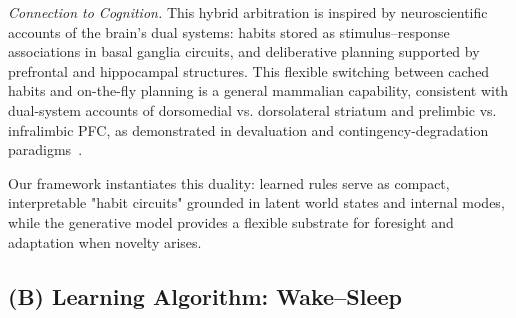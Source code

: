 \documentclass{article} %
\newcommand{\revise}[1]{#1}
\begin{document}
{\it Connection to Cognition.} \revise{This hybrid arbitration is inspired by neuroscientific accounts of the brain's dual systems: habits stored as stimulus--response associations in basal ganglia circuits, and deliberative planning supported by prefrontal and hippocampal structures. This flexible switching between cached habits and on-the-fly planning is a general mammalian capability, consistent with dual-system accounts of dorsomedial vs. dorsolateral striatum and prelimbic vs. infralimbic PFC, as demonstrated in devaluation and contingency-degradation paradigms~\citep{dolan2013goals, cushman2015habitual}.}

Our framework instantiates this duality: learned rules serve as compact, interpretable "habit circuits" grounded in latent world states and internal modes, while the generative model provides a flexible substrate for foresight and adaptation when novelty arises.  


\subsection{(B) Learning Algorithm: Wake--Sleep}
\label{subsec:wake_sleep_learning}
\end{document}
